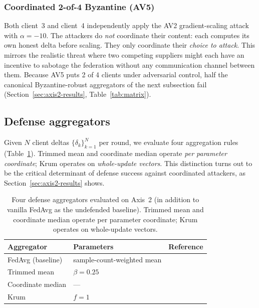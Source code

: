 \documentclass[preprint,12pt,authoryear]{elsarticle}
\begin{document}
\subsubsection{Coordinated 2-of-4 Byzantine (AV5)}
\label{subsec:coord}

Both client~3 and client~4 independently apply the AV2
gradient-scaling attack with $\alpha = -10$. The attackers do
\emph{not} coordinate their content: each computes its own honest
delta before scaling. They only coordinate their \emph{choice to
attack}. This mirrors the realistic threat where two competing
suppliers might each have an incentive to sabotage the federation
without any communication channel between them. Because AV5 puts
2 of 4 clients under adversarial control, half the canonical
Byzantine-robust aggregators of the next subsection fail
(Section~\ref{sec:axis2-results}, Table~\ref{tab:matrix}).

\subsection{Defense aggregators}
\label{subsec:defenses}

Given $N$ client deltas $\{\delta_k\}_{k=1}^N$ per round, we
evaluate four aggregation rules (Table~\ref{tab:defenses}).
Trimmed mean and coordinate median operate
\emph{per parameter coordinate}; Krum operates on
\emph{whole-update vectors}. This distinction turns out to be the
critical determinant of defense success against coordinated
attackers, as Section~\ref{sec:axis2-results} shows.

\begin{table}[!ht]
\centering
\footnotesize
\setlength{\tabcolsep}{6pt}
\renewcommand{\arraystretch}{1.15}
\caption{Four defense aggregators evaluated on Axis~2 (in addition
to vanilla FedAvg as the undefended baseline). Trimmed mean and
coordinate median operate per parameter coordinate; Krum operates
on whole-update vectors.}
\label{tab:defenses}
\begin{tabular}{@{}l l l@{}}
\toprule
Aggregator & Parameters & Reference \\
\midrule
FedAvg (baseline)    & sample-count-weighted mean & \citet{McMahan2017FedAvg} \\
Trimmed mean         & $\beta = 0.25$             & \citet{Yin2018RobustDistributed} \\
Coordinate median    & ---                         & \citet{Yin2018RobustDistributed} \\
Krum                 & $f = 1$                    & \citet{Blanchard2017Krum} \\
\bottomrule
\end{tabular}
\end{table}
\end{document}
